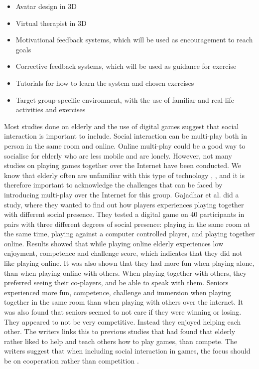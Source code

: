 \begin{itemize}
\item Avatar design in 3D
\item Virtual therapist in 3D
\item Motivational feedback systems, which will be used as encouragement  to reach goals
\item Corrective feedback systems, which will be used as guidance for exercise 
\item Tutorials for how to learn the system and chosen exercises
\item Target group-specific environment, with the use of familiar and real-life activities and exercises 
\end{itemize} 

Most studies done on elderly and the use of digital games suggest that social interaction is important to include. Social interaction can be multi-play both in person in the same room and online. Online multi-play could be a good way to socialise for elderly who are less mobile and are lonely. However, not many studies on playing games together over the Internet have been conducted. We know that elderly often are unfamiliar with this type of technology \cite{Billis}, \cite{gregor}, and it is therefore important to acknowledge the challenges that can be faced by introducing multi-play over the Internet for this group. Gajadhar et al. \cite{Gajadhar} did a study, where they wanted to find out how players experiences playing together with different social presence. They tested a digital game on 40 participants in pairs with three different degrees of social presence: playing in the same room at the same time, playing against a computer controlled player, and playing together online. Results showed that while playing online elderly experiences low enjoyment, competence and challenge score, which indicates that they did not like playing online. It was also shown that they had more fun when playing alone, than when playing online with others. When playing together with others, they preferred seeing their co-players, and be able to speak with them. Seniors experienced more fun, competence, challenge and immersion when playing together in the same room than when playing with others over the internet. It was also found that seniors seemed to not care if they were winning or losing. They appeared to not be very competitive. Instead they enjoyed helping each other. The writers links this to previous studies that had found that elderly rather liked to help and teach others how to play games, than compete. The writers suggest that when including social interaction in games, the focus should be on cooperation rather than competition \cite{Gajadhar}. 


